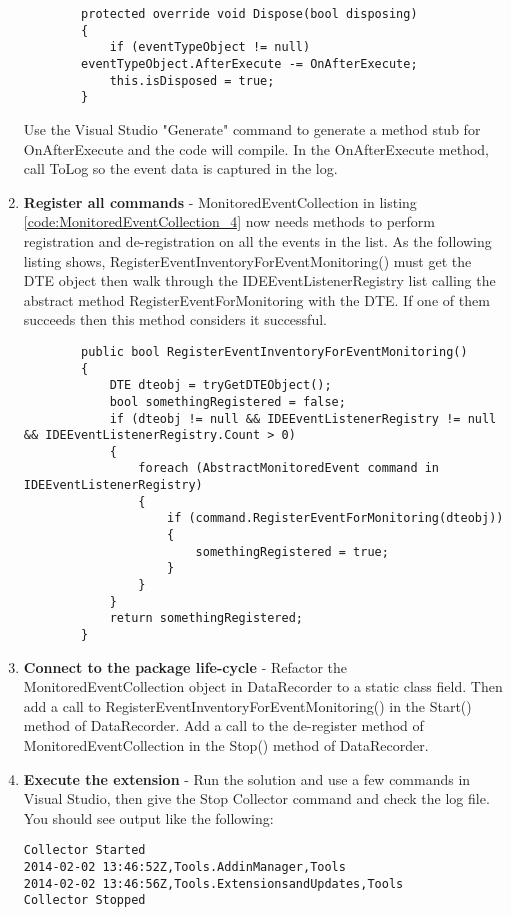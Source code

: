 \begin{enumerate}
\begin{lstlisting}
        protected override void Dispose(bool disposing)
        {
            if (eventTypeObject != null) 
		eventTypeObject.AfterExecute -= OnAfterExecute;
            this.isDisposed = true;
        }
\end{lstlisting}

Use the Visual Studio "Generate" command to generate a method stub for OnAfterExecute and the
code will compile.  In the OnAfterExecute method, call ToLog so the event data is captured in the log.

\item {\bf Register all commands} -  
MonitoredEventCollection in listing \ref{code:MonitoredEventCollection_4} now needs methods to perform registration and de-registration on all the events in the list.  As the following listing shows, RegisterEventInventoryForEventMonitoring() must get the DTE object then walk through the IDEEventListenerRegistry list calling the abstract method RegisterEventForMonitoring with the DTE.  If one of them succeeds then this method considers it successful.

\begin{lstlisting}
        public bool RegisterEventInventoryForEventMonitoring()
        {
            DTE dteobj = tryGetDTEObject();
            bool somethingRegistered = false;
            if (dteobj != null && IDEEventListenerRegistry != null && IDEEventListenerRegistry.Count > 0)
            {
                foreach (AbstractMonitoredEvent command in IDEEventListenerRegistry)
                {
                    if (command.RegisterEventForMonitoring(dteobj))
                    {
                        somethingRegistered = true;
                    }
                }
            }
            return somethingRegistered;
        }
\end{lstlisting}


\item {\bf Connect to the package life-cycle} - 
Refactor the MonitoredEventCollection object in DataRecorder to a static class field.  Then add a call to RegisterEventInventoryForEventMonitoring() in the Start() method of DataRecorder.  Add a call to the de-register method of MonitoredEventCollection in the Stop() method of DataRecorder.  

\item {\bf Execute the extension} - 
Run the solution and use a few commands in Visual Studio, then give the Stop Collector command and check the log file.  You should see output like the following:
\begin{verbatim}
Collector Started
2014-02-02 13:46:52Z,Tools.AddinManager,Tools
2014-02-02 13:46:56Z,Tools.ExtensionsandUpdates,Tools
Collector Stopped
\end{verbatim}


\end{enumerate}



